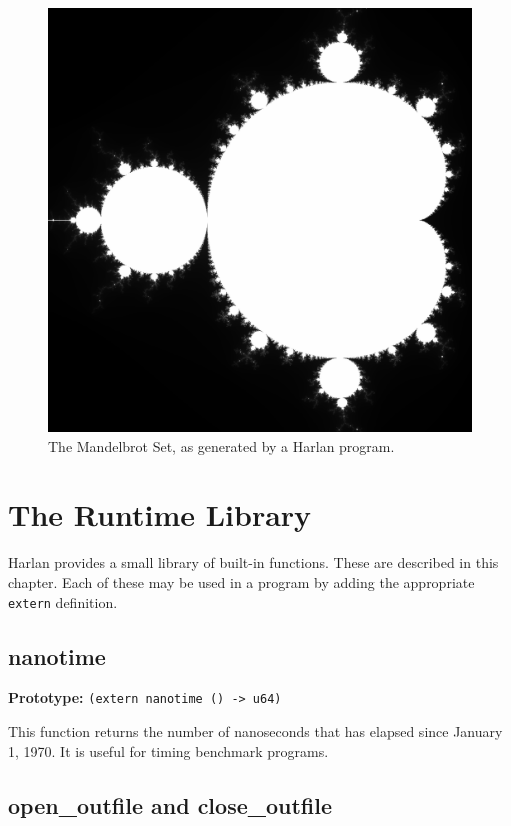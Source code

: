 \documentclass[oneside]{report}
\begin{document}
\begin{figure}
  \centering
  \includegraphics[width=\textwidth]{figures/mandelbrot.eps}
  \caption{The Mandelbrot Set, as generated by a Harlan program.}
  \label{fig:mandelbrot}
\end{figure}

\chapter{The Runtime Library}\label{chap:externs}

Harlan provides a small library of built-in functions. These are
described in this chapter. Each of these may be used in a program by
adding the appropriate \lstinline{extern} definition.

\section{nanotime}

\textbf{Prototype:} \lstinline{(extern nanotime () -> u64)}

This function returns the number of nanoseconds that has elapsed since
January 1, 1970.  It is useful for timing benchmark programs.

\section{open\_outfile and close\_outfile}
\end{document}
